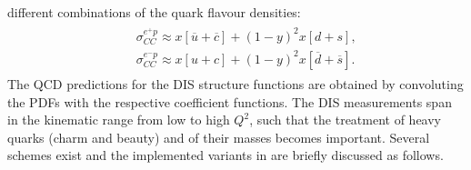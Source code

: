 different combinations of the quark flavour densities:
\begin{eqnarray}
    \begin{array}{rll}
     & & \sigma_{CC}^{e^{+} p} \approx 
        x [\overline u + \overline c] + (1-y)^2 x [d+s], \\
     & & \sigma_{CC}^{e^{-} p} \approx 
        x[u+c] + (1-y)^2 x[\overline d + \overline s].
    \end{array}
\end{eqnarray}
%
The QCD predictions for the DIS structure functions are obtained by convoluting 
the PDFs with the respective coefficient functions. The DIS measurements span in the kinematic range from low to high $Q^2$, such that  
the treatment of heavy quarks (charm and beauty) and of their masses becomes important. 
Several schemes exist and the implemented variants in \fitter are briefly discussed as follows.



